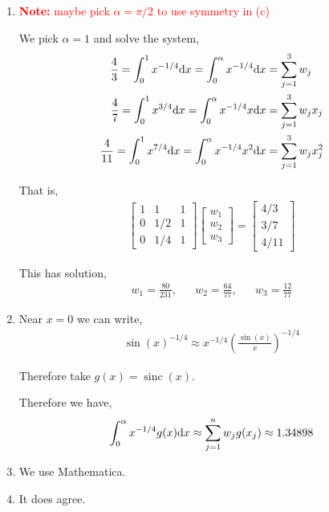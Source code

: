 \documentclass[10pt]{article}
\newcommand{\note}[1]{\textcolor{red}{\textbf{Note:} #1}}
\begin{document}
\begin{solution}[Solution]
\begin{enumerate}[label=(\alph*)]
    \item

        \note{maybe pick \( \alpha = \pi/2 \) to use symmetry in (c)}

        We pick \( \alpha = 1 \) and solve the system,
        \begin{align*}
            \frac{4}{3} = \int_0^1 x^{-1/4}\mathrm{d} x = \int_0^\alpha x^{-1/4}\mathrm{d} x &= \sum_{j=1}^3 w_j  \\
            \frac{4}{7} = \int_0^1 x^{3/4}\mathrm{d} x = \int_0^\alpha x^{-1/4} x\mathrm{d} x &= \sum_{j=1}^3 w_j x_j \\
            \frac{4}{11} = \int_0^1 x^{7/4}\mathrm{d} x = \int_0^\alpha x^{-1/4} x^2\mathrm{d} x &= \sum_{j=1}^3 w_j x_j^2 \\
        \end{align*}
        
        That is,
        \begin{align*}
            \left[\begin{array}{ccc}
                1 & 1 & 1 \\
                0 & 1/2 & 1\\
                0 & 1/4 & 1
            \end{array}\right]
            \left[\begin{array}{c}w_1 \\ w_2 \\ w_3\end{array}\right]
                = 
            \left[\begin{array}{c} 4/3 \\ 3/7 \\ 4/11\end{array}\right]
        \end{align*}
        
        This has solution,
        \begin{align*}
            w_1 = \frac{80}{231}, && 
            w_2 = \frac{64}{77}, &&
            w_3 = \frac{12}{77}
        \end{align*}

       
    \item
        Near \( x=0 \) we can write,
        \begin{align*}
            \sin(x)^{-1/4} \approx x^{-1/4} \left( \frac{\sin(x)}{x} \right)^{-1/4}
        \end{align*}
        
        Therefore take \( g(x) = \operatorname{sinc}(x) \).
        
        Therefore we have,
        \begin{align*}
            \int_0^\alpha x^{-1/4} g(x) \mathrm{d} x
            \approx \sum_{j=1}^{n} w_j g(x_j)
            \approx 1.34898
        \end{align*}
        
    \item We use Mathematica.
    \item It does agree.
\end{enumerate}
\end{solution}
\end{document}

